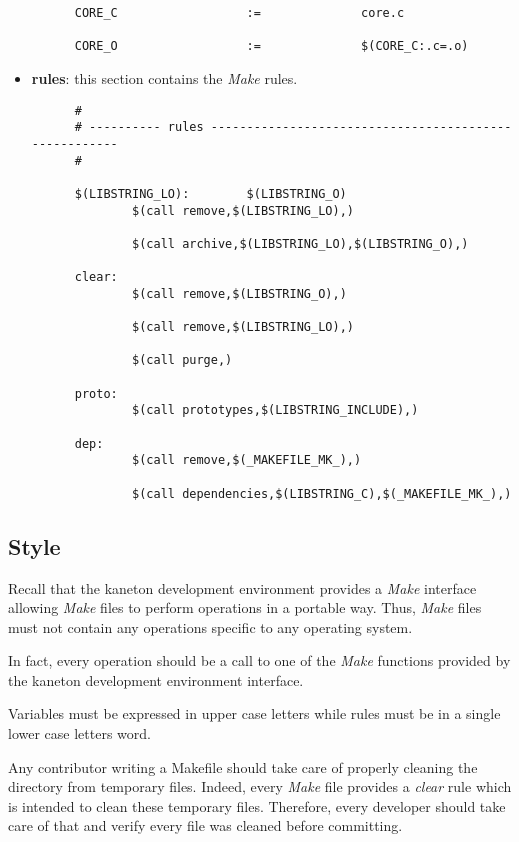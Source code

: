\begin{itemize}
\begin{verbatim}
      CORE_C                  :=              core.c

      CORE_O                  :=              $(CORE_C:.c=.o)
    \end{verbatim}
  \item
    \textbf{rules}: this section contains the \textit{Make} rules.

    \begin{verbatim}
      #
      # ---------- rules ------------------------------------------------------
      #

      $(LIBSTRING_LO):        $(LIBSTRING_O)
              $(call remove,$(LIBSTRING_LO),)

              $(call archive,$(LIBSTRING_LO),$(LIBSTRING_O),)

      clear:
              $(call remove,$(LIBSTRING_O),)

              $(call remove,$(LIBSTRING_LO),)

              $(call purge,)

      proto:
              $(call prototypes,$(LIBSTRING_INCLUDE),)

      dep:
              $(call remove,$(_MAKEFILE_MK_),)

              $(call dependencies,$(LIBSTRING_C),$(_MAKEFILE_MK_),)
    \end{verbatim}
\end{itemize}


\subsection{Style}

Recall that the kaneton development environment provides a \textit{Make}
interface allowing \textit{Make} files to perform operations in a portable
way. Thus, \textit{Make} files must not contain any operations specific
to any operating system.

In fact, every operation should be a call to one of the \textit{Make} functions
provided by the kaneton development environment interface.

Variables must be expressed in upper case letters while rules must be in a
single lower case letters word.

Any contributor writing a Makefile should take care of properly cleaning
the directory from temporary files. Indeed, every \textit{Make} file
provides a \textit{clear} rule which is intended to clean these temporary
files. Therefore, every developer should take care of that and verify every
file was cleaned before committing.

